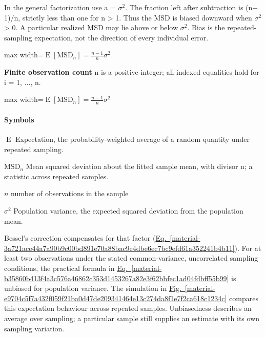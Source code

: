 \documentclass[11pt,a4paper]{article}
\begin{document}
In the general factorization use a = \ensuremath{\sigma}\ensuremath{{}^2}.
The fraction left after subtraction is (n\ensuremath{-}1)/n, strictly less than one for n > 1. Thus the MSD is biased downward when \ensuremath{\sigma}\ensuremath{{}^2} > 0.
A particular realized MSD may lie above or below \ensuremath{\sigma}\ensuremath{{}^2}. Bias is the repeated-sampling expectation, not the direction of every individual error.
\begin{center}\begin{adjustbox}{max width=\linewidth}$\displaystyle \operatorname{E}[\mathrm{MSD}_n]=\frac{n-1}{n}\sigma^2$\end{adjustbox}\end{center}

\par\textbf{Finite observation count} n is a positive integer; all indexed equalities hold for i = 1, \ensuremath{\ldots}, n.
\begin{center}\begin{adjustbox}{max width=\linewidth}$\displaystyle \operatorname{E}[\mathrm{MSD}_n]=\frac{n-1}{n}\sigma^2$\end{adjustbox}\end{center}

\paragraph{Symbols}
\par\noindent\textbf{\(\operatorname{E}\)} Expectation, the probability-weighted average of a random quantity under repeated sampling.
\par\noindent\textbf{\(\mathrm{MSD}_n\)} Mean squared deviation about the fitted sample mean, with divisor n; a statistic across repeated samples.
\par\noindent\textbf{\(n\)} number of observations in the sample
\par\noindent\textbf{\(\sigma^2\)} Population variance, the expected squared deviation from the population mean.
\medskip

Bessel's correction compensates for that factor (\hyperref[material-3a721ace44a7a90b9c00bd891e70a88bac9e4dbe6ec7bc9efd61a352241b4b11]{Eq.~\ref*{material-3a721ace44a7a90b9c00bd891e70a88bac9e4dbe6ec7bc9efd61a352241b4b11}}). For at least two observations under the stated common-variance, uncorrelated sampling conditions, the practical formula in \hyperref[material-b35860b413f4a3c576a46862c353d1453267a82e3f62bbfec1ad04fdbff55b99]{Eq.~\ref*{material-b35860b413f4a3c576a46862c353d1453267a82e3f62bbfec1ad04fdbff55b99}} is unbiased for population variance. The simulation in \hyperref[material-e9704c5f7a432f059f21ba0d47de209341464e13c274da8f1e7f2ca618c1234c]{Fig.~\ref*{material-e9704c5f7a432f059f21ba0d47de209341464e13c274da8f1e7f2ca618c1234c}} compares this expectation behaviour across repeated samples. Unbiasedness describes an average over sampling; a particular sample still supplies an estimate with its own sampling variation.
\end{document}
